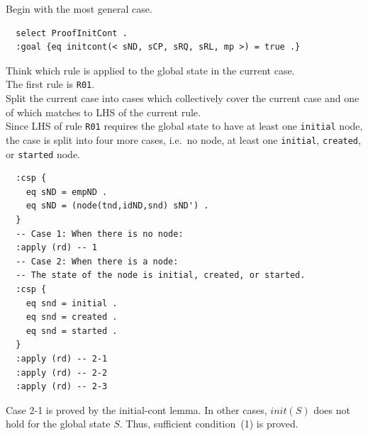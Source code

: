 \documentclass[12pt]{report}
\begin{document}
 Begin with the most general case.
\small
\begin{verbatim}
  select ProofInitCont .
  :goal {eq initcont(< sND, sCP, sRQ, sRL, mp >) = true .}
\end{verbatim}
\normalsize

 Think which rule is applied to the 
global state in the current case. \\
The first rule is {\tt R01}. \\

 Split the current case into cases which
collectively cover the current case and one of which matches to LHS of
the current rule. \\
Since LHS of rule {\tt R01} requires the global state to have at least
one {\tt initial} node, the case is split into four more cases, i.e.\ no
node, at least one {\tt initial}, {\tt created}, or {\tt started}
node.
\small
\begin{verbatim}
  :csp { 
    eq sND = empND .
    eq sND = (node(tnd,idND,snd) sND') .
  }
  -- Case 1: When there is no node:
  :apply (rd) -- 1
  -- Case 2: When there is a node:
  -- The state of the node is initial, created, or started.
  :csp { 
    eq snd = initial .
    eq snd = created .
    eq snd = started .
  }
  :apply (rd) -- 2-1
  :apply (rd) -- 2-2
  :apply (rd) -- 2-3
\end{verbatim}
\normalsize
Case 2-1 is proved by the initial-cont lemma. In other cases,
$init(S)$ does not hold for the global state $S$\!. Thus, sufficient
condition~(1) is proved.

\end{document}
